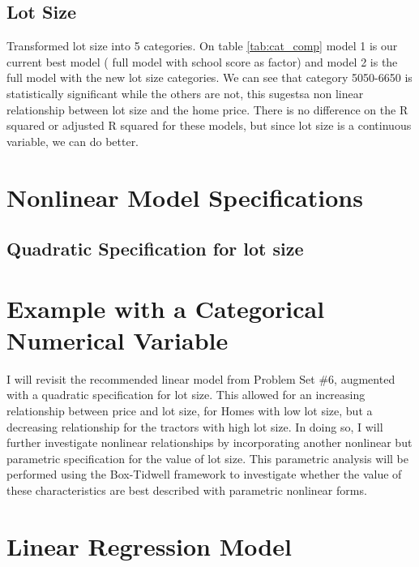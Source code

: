 \documentclass[11pt]{article}
\begin{document}


\subsection{Lot Size}
Transformed lot size into 5 categories. On table \ref{tab:cat_comp} model 1 is our current best model ( full model with school score as factor) and model 2 is the full model with the new lot size categories.
We can see that category  5050-6650 is statistically significant while the others are not, this sugestsa non linear relationship between lot size and the home price. There is no difference on the R squared or adjusted R squared for these models, but since
lot size is a continuous variable, we can do better.
 


\section{Nonlinear Model Specifications}
\subsection{Quadratic Specification for lot size}

\section{Example with a Categorical Numerical Variable}

I will revisit the recommended linear model
from Problem Set \#6, 
augmented with a quadratic specification for lot size.
This allowed for an increasing relationship 
between price and lot size, 
for Homes with low lot size, 
but a decreasing relationship for the tractors with high lot size. 
%
In doing so, I will further investigate nonlinear relationships
by incorporating another nonlinear but parametric specification
for the value of lot size. 
This parametric analysis will be performed
using the Box-Tidwell framework
to investigate whether the value of these characteristics
are best described with parametric nonlinear forms. 

\clearpage
\section{Linear Regression Model}
\end{document}
